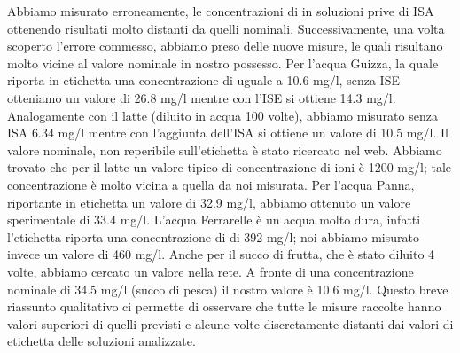 Abbiamo misurato erroneamente, le concentrazioni di  in soluzioni prive di ISA ottenendo risultati molto distanti da quelli nominali.
Successivamente, una volta scoperto l'errore commesso, abbiamo preso delle nuove misure, le quali risultano molto vicine al valore nominale in nostro possesso.
Per l'acqua Guizza, la quale riporta in etichetta una concentrazione di  uguale a 10.6 mg/l, senza ISE otteniamo un valore di 26.8 mg/l mentre con l'ISE si ottiene 14.3 mg/l.
Analogamente con il latte (diluito in acqua 100 volte), abbiamo misurato senza ISA 6.34 mg/l mentre con l'aggiunta dell'ISA si ottiene un valore di 10.5 mg/l.
Il valore nominale, non reperibile sull'etichetta è stato ricercato nel web.
Abbiamo trovato che per il latte un valore tipico di concentrazione di ioni  è 1200 mg/l; tale concentrazione è molto vicina a quella da noi misurata.
Per l'acqua Panna, riportante in etichetta un valore di 32.9 mg/l, abbiamo ottenuto un valore sperimentale di 33.4 mg/l.
L'acqua Ferrarelle è un acqua molto dura, infatti l'etichetta riporta una concentrazione di  di 392 mg/l; noi abbiamo misurato invece un valore di 460 mg/l.
Anche per il succo di frutta, che è stato diluito 4 volte, abbiamo cercato un valore nella rete. A fronte di una concentrazione nominale di 34.5 mg/l (succo di pesca) il nostro valore è 10.6 mg/l.
Questo breve riassunto qualitativo ci permette di osservare che tutte le misure raccolte hanno valori superiori di quelli previsti e alcune volte discretamente distanti dai valori di etichetta delle soluzioni analizzate.

